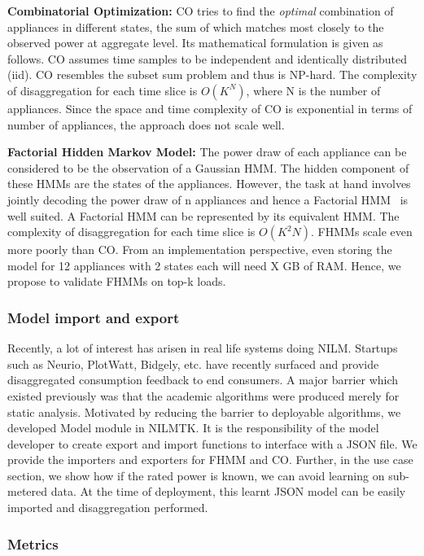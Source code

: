 \documentclass{sig-alternate}
\begin{document}
\noindent \textbf{Combinatorial Optimization:} CO tries to find the \textit{optimal} combination of appliances in different states, the sum of which matches most closely to the observed power at aggregate level.  Its mathematical formulation is given as follows. CO assumes time samples to be independent and identically distributed (iid). CO resembles the subset sum problem and thus is NP-hard. The complexity of disaggregation for each time slice is $O(K^N)$, where N is the number of appliances. Since the space and time complexity of CO is exponential in terms of number of appliances, the approach does not scale well.

\noindent \textbf{Factorial Hidden Markov Model:} The power draw of each appliance can be considered to be the observation of a Gaussian HMM. The hidden component of these HMMs are the states of the appliances. However, the task at hand involves jointly decoding the power draw of n appliances and hence a Factorial HMM~\cite{fhmm} is well suited. A Factorial HMM can be represented by its equivalent HMM. The complexity of disaggregation for each time slice is $O(K^2N)$. FHMMs scale even more poorly than CO. From an implementation perspective, even storing the model for 12 appliances with 2 states each will need X GB of RAM. Hence, we propose to validate FHMMs on top-k loads.



\subsubsection{Model import and export} Recently, a lot of interest has arisen in real life systems doing NILM. Startups such as Neurio, PlotWatt, Bidgely, etc. have recently surfaced and provide disaggregated consumption feedback to end consumers. A major barrier which existed previously was that the academic algorithms were produced merely for static analysis. Motivated by reducing the barrier to deployable algorithms, we developed Model module in NILMTK. It is the responsibility of the model developer to create export and import functions to interface with a JSON file. We provide the importers and exporters for FHMM and CO. Further, in the use case section, we show how if the rated power is known, we can avoid learning on sub-metered data. At the time of deployment, this learnt JSON model can be easily imported and disaggregation performed.

\subsubsection{Metrics}
\end{document}
